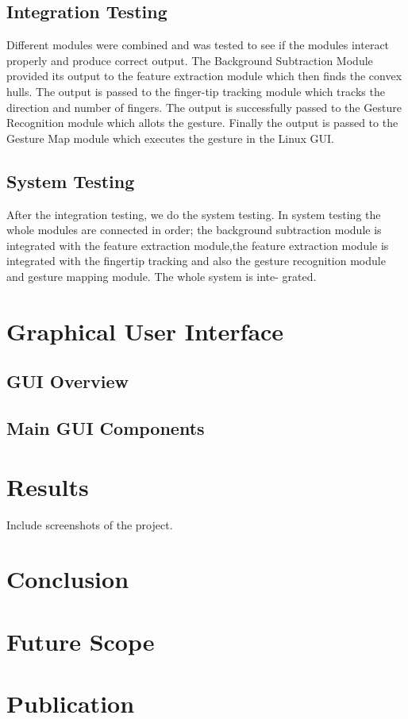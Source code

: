 \documentclass[11pt]{report}
\begin{document}
\section{Integration Testing}

Different modules were combined and was tested to see if the modules interact properly and produce
correct output. The Background Subtraction Module provided its output to the feature extraction module
which then finds the convex hulls. The output is passed to the finger-tip tracking module which tracks the 
direction and number of fingers. The output is successfully passed to the Gesture Recognition module which allots the gesture.
Finally the output is passed to the Gesture Map module which executes the gesture in the Linux GUI.

\section{System Testing}

After the integration testing, we do the system testing. In system testing the whole modules are
connected in order; the background subtraction module is integrated with the feature extraction module,the
feature extraction module is integrated with the fingertip tracking and also the gesture recognition
module and gesture mapping module. The whole system is inte-
grated.



\chapter{Graphical User Interface}
\section{GUI Overview}
\section{Main GUI Components}

\chapter{Results}
Include screenshots of the project.

\chapter{Conclusion}

\chapter{Future Scope}

\chapter{Publication}
   
\begin{thebibliography}{999}
\bibitem{}


\end{thebibliography}
\end{document}
